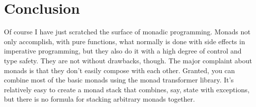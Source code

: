 \section{Conclusion}\label{conclusion}

Of course I have just scratched the surface of monadic programming.
Monads not only accomplish, with pure functions, what normally is done
with side effects in imperative programming, but they also do it with a
high degree of control and type safety. They are not without drawbacks,
though. The major complaint about monads is that they don't easily
compose with each other. Granted, you can combine most of the basic
monads using the monad transformer library. It's relatively easy to
create a monad stack that combines, say, state with exceptions, but
there is no formula for stacking arbitrary monads together.